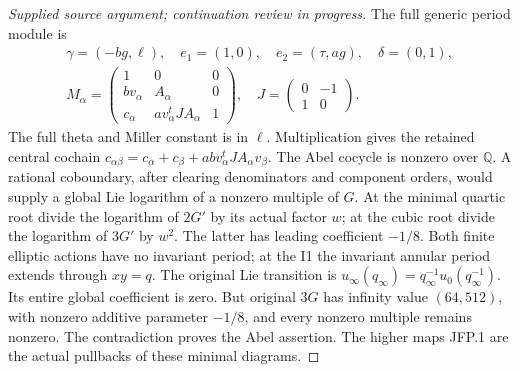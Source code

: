\begin{proof}[Supplied source argument; continuation review in progress]
The full generic period module is
\[
\begin{gathered}
 \gamma=(-bg,\ell),\quad e_1=(1,0),\quad e_2=(\tau,ag),
 \quad\delta=(0,1),\\
 M_\alpha=
 \begin{pmatrix}1&0&0\\bv_\alpha&A_\alpha&0\\
 c_\alpha&a v_\alpha^tJ A_\alpha&1\end{pmatrix},
 \quad J=\begin{pmatrix}0&-1\\1&0\end{pmatrix}.
\end{gathered}
\tag{JFP.30}
\]
The full theta and Miller constant is in \(\ell\). Multiplication
gives the retained central cochain
\(c_{\alpha\beta}=c_\alpha+c_\beta+abv_\alpha^tJ A_\alpha v_\beta\).
The Abel cocycle is nonzero over \(\mathbb Q\). A rational
coboundary, after clearing denominators and component orders,
would supply a global Lie logarithm of a nonzero multiple of
\(G\). At the minimal quartic root divide the logarithm of
\(2G'\) by its actual factor \(w\); at the cubic root divide
the logarithm of \(3G'\) by \(w^2\). The latter has leading
coefficient \(-1/8\). Both finite elliptic actions have no
invariant period; at the I1 the invariant annular period extends
through \(xy=q\). The original Lie transition is
\(u_\infty(q_\infty)=q_\infty^{-1}u_0(q_\infty^{-1})\).
Its entire global coefficient is zero. But original \(3G\)
has infinity value \((64,512)\), with nonzero additive parameter
\(-1/8\), and every nonzero multiple remains nonzero. The
contradiction proves the Abel assertion. The higher maps JFP.1
are the actual pullbacks of these minimal diagrams.


\end{proof}
